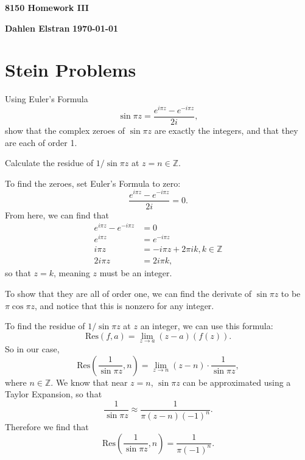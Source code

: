 \documentclass[12pt]{article}
\begin{document}
\begin{newtitle}
  \begin{center}
    \textbf{\Huge 8150 Homework III}
  \end{center}
  \textbf{Dahlen Elstran} \hfill \textbf{\today}
\end{newtitle}

\section*{Stein Problems}


\begin{statement}[1]
  Using Euler's Formula
  $$ \sin \pi z = \frac{e^{i \pi z}-e^{-i \pi z}}{2i}, $$
  show that the complex zeroes of $\sin \pi z$ are exactly the integers, and that they are each of order 1. 
  \par Calculate the residue of $1/\sin \pi z$ at $z=n \in \mathbb{Z}$. 
\end{statement}
\begin{newproof}
  To find the zeroes, set Euler's Formula to zero:
  $$ \frac{e^{i \pi z}-e^{-i \pi z}}{2i} = 0. $$
  From here, we can find that 
  \begin{align*}
    e^{i \pi z} - e^{-i \pi z} &= 0 \\
    e^{i \pi z} &= e^{-i \pi z} \\ 
    i \pi z &= -i \pi z + 2 \pi i k , k \in \mathbb{Z} \\
    2i \pi z &= 2 i \pi k,
  \end{align*}
  so that $z = k$, meaning $z$ must be an integer. 
  \par To show that they are all of order one, we can find the derivate of $\sin \pi z$ to be 
  $ \pi \cos \pi z$, and notice that this is nonzero for any integer. 
  \par To find the residue of $1 / \sin \pi z$ at $z$ an integer, we can use this formula:
  $$ \text{Res}(f,a)=\lim_{z \to a} (z-a)(f(z)). $$
  So in our case, 
  $$ \text{Res}(\frac{1}{\sin \pi z}, n) = \lim_{z \to n} (z-n) \cdot \frac{1}{\sin \pi z}, $$
  where $n \in \mathbb{Z}$. 
  We know that near $z=n$, $\sin \pi z$ can be approximated using a Taylor Expansion, so that 
  $$ \frac{1}{\sin \pi z} \approx \frac{1}{\pi (z-n)(-1)^n}. $$
  Therefore we find that 
  $$ \text{Res}(\frac{1}{\sin \pi z}, n ) = \frac{1}{\pi (-1)^n}. $$
\end{newproof}

\end{document}

